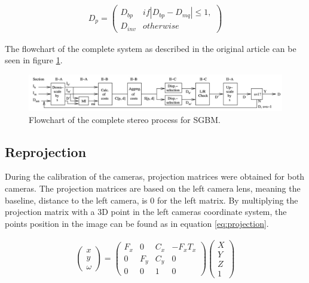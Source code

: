 \begin{equation}\label{eq:consistency}
\begin{split}
D_{p} =  
\begin{pmatrix}
	D_{bp}	&  if|D_{bp} - D_{mq}| \leq 1, \\
	D_{inv} & otherwise
 \end{pmatrix}
\end{split}
\end{equation} 


The flowchart of the complete system as described in the original article \cite{Hirschmuller2008} can be seen in figure \ref{fig:complete_system}.


\begin{figure}[h!]
  \centering
    \includegraphics[width=\textwidth]{graphics/06_vision/complete_system.jpg}
     \caption{ Flowchart of the complete stereo process for SGBM. } 
    \label{fig:complete_system}
\end{figure}


\subsection{Reprojection} \label{sec:reprojection}

During the calibration of the cameras, projection matrices were obtained for both cameras. The projection matrices are based on the left camera lens, meaning the baseline, distance to the left camera, is 0 for the left matrix. By multiplying the projection matrix with a 3D point in the left cameras coordinate system, the points position in the image can be found as in equation \ref{eq:projection}. 


\begin{equation}\label{eq:projection}
 \begin{split}
  \begin{pmatrix}
   x \\
   y \\
   \omega 
  \end{pmatrix}	
  = 
  \begin{pmatrix}
    F_{x} & 0 & C_{x} & -F_{x}T_{x} \\
    0 & F_{y} & C_{y} & 0 \\
    0 & 0 & 1 & 0
  \end{pmatrix}
  \begin{pmatrix}
   X \\
   Y \\
   Z \\
   1 
  \end{pmatrix}	
 \end{split}
\end{equation}  


